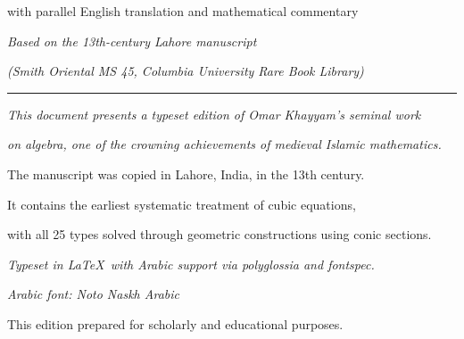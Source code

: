 \begin{titlepage}
\begin{center}
\vspace{0.3cm}

{\normalsize with parallel English translation and mathematical commentary}

\vspace{2cm}

{\small
\textit{Based on the 13th-century Lahore manuscript}}

\vspace{0.2cm}

{\small
\textit{(Smith Oriental MS 45, Columbia University Rare Book Library)}}

\vspace{1cm}

{
\color{titlecolor}
\rule{\textwidth}{1.5pt}}

\end{center}

\end{titlepage}



\thispagestyle{empty}
\vspace*{10cm}

\begin{center}

{\small
\textit{This document presents a typeset edition of Omar Khayyam's seminal work}}

{\small
\textit{on algebra, one of the crowning achievements of medieval Islamic mathematics.}}

\vspace{0.5cm}
{\small The manuscript was copied in Lahore, India, in the 13th century.}

{\small It contains the earliest systematic treatment of cubic equations,}

{\small with all 25 types solved through geometric constructions using conic sections.}

\vspace{0.5cm}

{\small
\textit{Typeset in \LaTeX\ with Arabic support via polyglossia and fontspec.}}

{\small
\textit{Arabic font: Noto Naskh Arabic}}

\vspace{0.5cm}

{\footnotesize This edition prepared for scholarly and educational purposes.}

\end{center}

